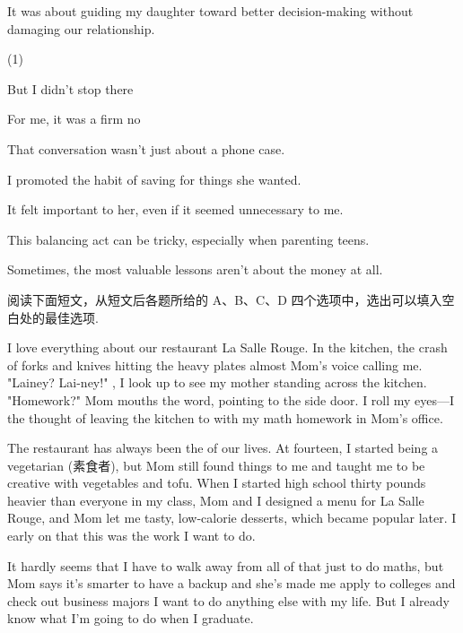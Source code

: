 \documentclass{英语试卷}
\begin{document}
\par {} It was about guiding my daughter toward better decision-making without damaging our relationship.\par
\begin{choices}(1)
  \item But I didn't stop there
  \item For me, it was a firm no
  \item That conversation wasn't just about a phone case.
  \item I promoted the habit of saving for things she wanted.
  \item It felt important to her, even if it seemed unnecessary to me.
  \item This balancing act can be tricky, especially when parenting teens.
  \item Sometimes, the most valuable lessons aren't about the money at all.
\end{choices}
\par 阅读下面短文，从短文后各题所给的 A、B、C、D 四个选项中，选出可以填入空白处的最佳选项.\par
\par I love everything about our restaurant La Salle Rouge. In the kitchen, the crash of forks and knives hitting the heavy plates almost  Mom's voice calling me. "Lainey? Lai-ney!" , I look up to see my mother standing across the kitchen. "Homework?" Mom mouths the word, pointing to the side door. I roll my eyes—I  the thought of leaving the kitchen to  with my math homework in Mom's office.\par
\par The restaurant has always been the  of our lives. At fourteen, I started being a vegetarian (素食者), but Mom still found things to  me and taught me to be creative with vegetables and tofu. When I started high school thirty pounds heavier than everyone in my class, Mom and I designed a  menu for La Salle Rouge, and Mom let me  tasty, low-calorie desserts, which became popular later. I  early on that this was the work I want to do.\par
\par It hardly seems  that I have to walk away from all of that just to do maths, but Mom says it's smarter to have a backup  and she's made me apply to colleges and check out business majors  I want to do anything else with my life. But I already know what I'm going to do when I graduate.\par
\end{document}
